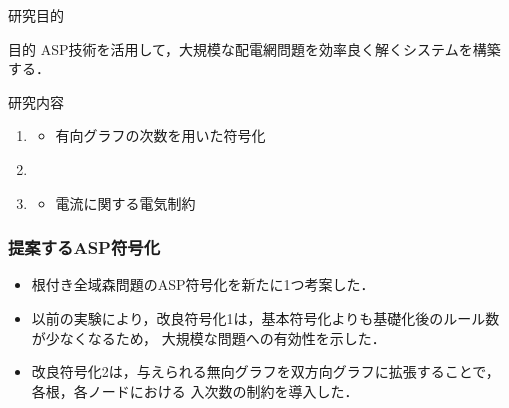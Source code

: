 \documentclass[dvipdfmx,11pt]{beamer}
\begin{document}
\begin{frame}{研究目的}
  \begin{alertblock}{目的}\centering
    ASP技術を活用して，大規模な配電網問題を効率良く解くシステムを構築
    する．
  \end{alertblock}
  \vfill
  \begin{block}{研究内容}
    \begin{enumerate}
    \item {}
      \begin{itemize}
	   \item 有向グラフの次数を用いた符号化
      \end{itemize}
	 \item {}
	 \item {}
      \begin{itemize}
	   \item 電流に関する電気制約
      \end{itemize}
    \end{enumerate}
  \end{block}
\end{frame}
\begin{frame}\frametitle{提案するASP符号化}
 
\begin{itemize}
 \item  根付き全域森問題のASP符号化を新たに1つ考案した．
\end{itemize}
 
\begin{table}[t]
 \centering
 
\end{table}

 \begin{itemize}
  \item 以前の実験により，改良符号化1は，基本符号化よりも基礎化後のルール数が少なくなるため，
 		大規模な問題への有効性を示した．
  \item 改良符号化2は，与えられる無向グラフを双方向グラフに拡張することで，各根，各ノードにおける
		入次数の制約を導入した．
 \end{itemize}
 
\end{frame}
\end{document}
